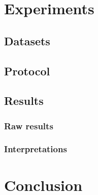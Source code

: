 \documentclass{article}
\begin{document}



\newpage
\section{Experiments}

\subsection{Datasets}
\subsection{Protocol}
\subsection{Results}
\subsubsection{Raw results}
\subsubsection{Interpretations}

\newpage
\section*{Conclusion}
\end{document}
